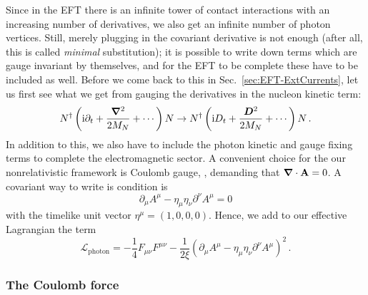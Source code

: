 Since in the EFT there is an infinite tower of contact interactions with an 
increasing number of derivatives, we also get an infinite number of photon 
vertices.  Still, merely plugging in the covariant derivative is not enough 
(after all, this is called \emph{minimal} substitution); it is possible to write 
down terms which are gauge invariant by themselves, and for the EFT to be 
complete these have to be included as well.  Before we come back to this in 
Sec.~\ref{sec:EFT-ExtCurrents}, let us first see what we get from gauging the 
derivatives in the nucleon kinetic term:
%
\begin{equation}
 N^\dagger \left(\mathrm{i}\partial_t + \frac{\boldsymbol{\nabla}^2}{2M_N} + \cdots\right)N
 \rightarrow
 N^\dagger \left(\mathrm{i} D_t + \frac{\boldsymbol{D}^2}{2M_N} + \cdots\right)N \,.
\end{equation}
%
In addition to this, we also have to include the photon 
kinetic and gauge fixing terms to complete the electromagnetic sector.  A 
convenient choice for the our nonrelativistic framework is Coulomb gauge, \ie, 
demanding that $\boldsymbol{\nabla}\cdot\mathbf{A}=0$.  A covariant way to write is condition is
%
\begin{equation}
 \partial_\mu A^\mu-\eta_\mu\eta_\nu\partial^\nu A^\mu = 0
\label{eq:Coulomb-Gauge}
\end{equation}
%
with the timelike unit vector $\eta^\mu=(1,0,0,0)$.  Hence, we add to our 
effective Lagrangian the term
%
\begin{equation}
 \mathcal{L}_\mathrm{photon} = -\frac14 F_{\mu\nu}F^{\mu\nu} -\frac{1}{2\xi}
 \left(\partial_\mu A^\mu-\eta_\mu\eta_\nu\partial^\nu A^\mu\right)^2 \,.
\label{eq:L-photon}
\end{equation}

\subsubsection{The Coulomb force}

